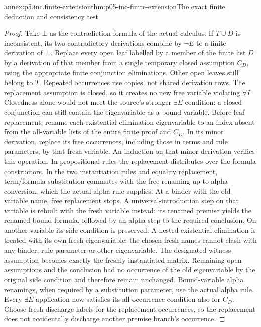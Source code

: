 \begin{annexitem}{annex:p5.inc.finite-extension}{thm:p05-inc-finite-extension}{The exact finite deduction and consistency test}
\begin{proof}
Take \(\bot\) as the contradiction formula of the actual calculus.
If \(T\cup D\) is inconsistent, its two contradictory derivations
combine by \(\neg E\) to a finite derivation of \(\bot\).
Replace every open leaf labelled by a member of the finite list \(D\)
by a derivation of that member from a single temporary closed
assumption \(C_D\), using the appropriate finite conjunction
eliminations. Other open leaves still belong to \(T\).
Repeated occurrences use copies, not shared derivation rows.
The replacement assumption is closed, so it creates no new free
variable violating \(\forall I\). Closedness alone would not meet
the source's stronger \(\exists E\) condition: a closed conjunction
can still contain the eigenvariable as a bound variable. Before leaf
replacement, rename each existential-elimination eigenvariable to an
index absent from the all-variable lists of the entire finite proof
and \(C_D\). In its minor derivation, replace its free occurrences,
including those in terms and rule parameters, by that fresh variable.
An induction on that minor derivation verifies this operation. In
propositional rules the replacement distributes over the formula
constructors. In the two instantiation rules and equality replacement,
term/formula substitution commutes with the free renaming up to alpha
conversion, which the actual alpha rule supplies. At a binder with
the old variable name, free replacement stops. A universal-introduction
step on that variable is rebuilt with the fresh variable instead:
its renamed premise yields the renamed bound formula, followed by
an alpha step to the required conclusion. On another variable its
side condition is preserved. A nested existential elimination is
treated with its own fresh eigenvariable; the chosen fresh names
cannot clash with any binder, rule parameter or other eigenvariable.
The designated witness assumption becomes exactly the freshly
instantiated matrix. Remaining open assumptions and the conclusion
had no occurrence of the old eigenvariable by the original side
condition and therefore remain unchanged. Bound-variable alpha
renamings, when required by a substitution parameter, use the actual
alpha rule. Every \(\exists E\) application now satisfies its
all-occurrence condition also for \(C_D\). Choose fresh discharge
labels for the replacement occurrences, so the replacement does not
accidentally discharge another premise branch's occurrence.


\end{proof}
\end{annexitem}

